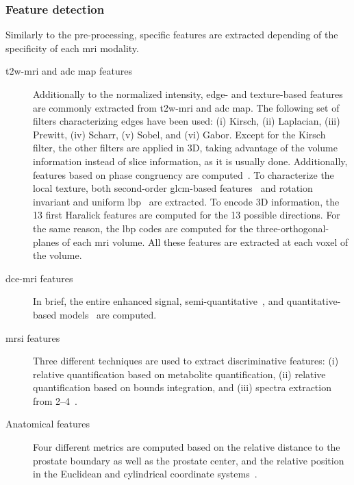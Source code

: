 \documentclass[conference]{sty/ieeeconf}
\begin{document}
\subsubsection{Feature detection}\label{subsec:chp6:method:fea-det}
Similarly to the pre-processing, specific features are extracted
depending of the specificity of each \ac{mri} modality.
\begin{description}
\item[\ac{t2w}-\ac{mri} and \ac{adc} map features]
Additionally to the normalized intensity, edge- and texture-based
features are commonly extracted from \ac{t2w}-\ac{mri} and \ac{adc}
map.
The following set of filters characterizing edges have been used: (i)
Kirsch, (ii) Laplacian, (iii) Prewitt, (iv) Scharr, (v) Sobel, and
(vi) Gabor.
Except for the Kirsch filter, the other filters are applied in 3D,
taking advantage of the volume information instead of slice
information, as it is usually done.
Additionally, features based on phase congruency are
computed~\cite{kovesi1999image}.
To characterize the local texture, both second-order \ac{glcm}-based
features~\cite{Haralick1973} and rotation invariant and uniform
\ac{lbp}~\cite{ojala2002multiresolution} are extracted.
To encode 3D information, the 13 first Haralick features are computed
for the 13 possible directions.
For the same reason, the \ac{lbp} codes are computed for the
three-orthogonal-planes of each \ac{mri} volume.
All these features are extracted at each voxel of the volume.

\item[\ac{dce}-\ac{mri} features]
In brief, the entire enhanced signal, semi-quantitative~\cite{Huisman2001}, and
quantitative-based
models~\cite{brix1991pharmacokinetic,hoffmann1995pharmacokinetic,tofts1995quantitative,giannini2015fully}
are computed.

\item[\ac{mrsi} features]
Three different techniques are used to extract
discriminative features: (i) relative quantification based on
metabolite quantification, (ii) relative
quantification based on bounds integration, and (iii) spectra
extraction from \SIrange{2}{4}{\ppm}~\cite{Lemaitre2016thesis}.

\item[Anatomical features]
Four different metrics are computed based on the relative distance to the
prostate boundary as well as the prostate center, and the relative
position in the Euclidean and cylindrical coordinate
systems~\cite{Chen2002,Litjens2014}.

\end{description}
\end{document}
